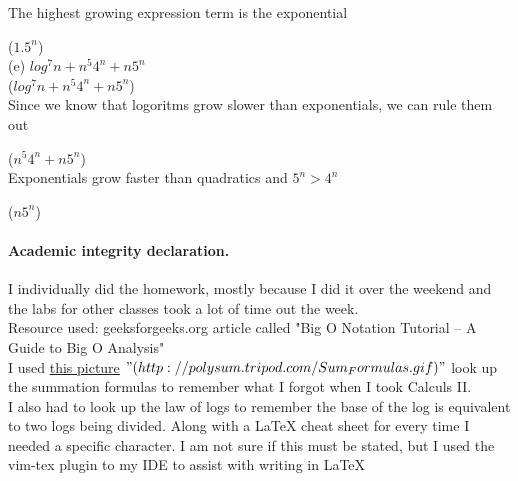 \documentclass[11pt]{article}
\newcounter{prnum}
\newenvironment{problem}{{\vskip 0.2in\noindent\bf Problem
       \addtocounter{prnum}{1} \arabic{prnum}.}}{\vskip 0.1in}
\begin{document}
\begin{problem}
    The highest growing expression term is the exponential
    \smallskip

    \Theta($1.5^n$) \\

    \noindent(e) $log^7 n + n^5 4^n + n5^n $   \\

    \Theta($log^7 n + n^5 4^n + n5^n$) \\

    Since we know that logoritms grow slower than exponentials, we can rule them out
    \smallskip

    \Theta($n^5 4^n + n5^n$) \\

    Exponentials grow faster than quadratics and 
    $5^n > 4^n$
    \smallskip

    \Theta($n 5^n$)
    
\end{problem}


\vskip 0.2in
\paragraph{Academic integrity declaration.}

I individually did the homework, mostly because I did it over the weekend
and the labs for other classes took a lot of time out the week. \\

Resource used: geeksforgeeks.org article called "Big O Notation Tutorial – A Guide to Big O Analysis" \\
I used \href{http://polysum.tripod.com/Sum_Formulas.gif}{this picture} 
$"(http://polysum.tripod.com/Sum_Formulas.gif)"$
look up the summation formulas to remember what I forgot when I took Calculs II.\\

I also had to look up the law of logs to remember the base of the log is equivalent to two logs being divided. 
Along with a \LaTeX  
cheat sheet for every time I needed a specific character. 
I am not sure if this must be stated, but I used the vim-tex plugin to my IDE to assist with writing in \LaTeX \\
\end{document}
